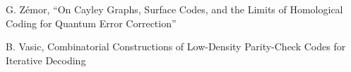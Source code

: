 \documentclass[a4paper,fleqn]{cas-sc}
\begin{document}
\begin{thebibliography}{0}
G. Zémor, “On Cayley Graphs, Surface Codes, and the Limits of Homological Coding for Quantum Error Correction”

B. Vasic, Combinatorial Constructions of Low-Density Parity-Check Codes for Iterative Decoding







\end{thebibliography}
\end{document}

